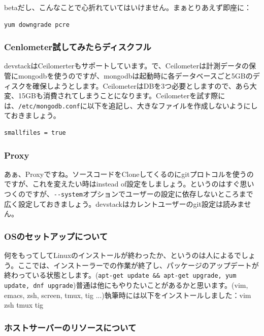 \documentclass[9pt,b5paper,tombo,openany,dvipdfmx]{jsbook}
\begin{document}
betaだし、こんなことで心折れていてはいけません。まぁとりあえず即座に：

\begin{lstlisting}
yum downgrade pcre
\end{lstlisting}

\subsubsection{Cenlometer試してみたらディスクフル}

devstackはCeilomerterもサポートしています。で、Ceilometerは計測データの保管にmongodbを使うのですが、mongodbは起動時に各データベースごと5GBのディスクを確保しようとします。CeilometerはDBを3つ必要としますので、あら大変、15GBも消費されてしまうことになります。Ceilometerを試す際には、\verb|/etc/mongodb.conf|に以下を追記し、大きなファイルを作成しないようにしておきましょう。

\begin{lstlisting}
smallfiles = true
\end{lstlisting}

\subsubsection{Proxy}

あぁ、Proxyですね。ソースコードをCloneしてくるのにgitプロトコルを使うのですが、これを変えたい時はinstead of設定をしましょう。というのはすぐ思いつくのですが、\verb|--system|オプションでユーザーの設定に依存しないところまで広く設定しておきましょう。devstackはカレントユーザーのgit設定は読みません。

\subsubsection{OSのセットアップについて}

何をもってしてLinuxのインストールが終わったか、というのは人によるでしょう。ここでは、インストーラーでの作業が終了し、パッケージのアップデートが終わっている状態とします。(\verb|apt-get update && apt-get upgrade, yum update, dnf upgrade|)普通は他にもやりたいことがあるかと思います。(vim, emacs, zsh, screen, tmux, tig ...)執筆時には以下をインストールしました：vim zsh tmux tig

\subsubsection{ホストサーバーのリソースについて}
\end{document}
